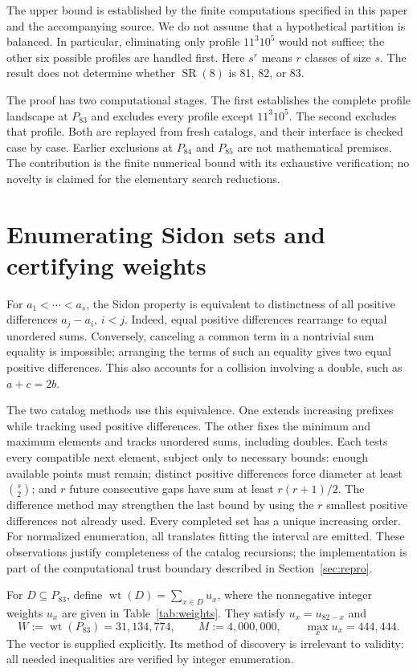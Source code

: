 \documentclass[11pt]{article}
\newcommand{\SR}{\operatorname{SR}}
\newcommand{\wt}{\operatorname{wt}}
\newcommand{\PP}{P_{83}}
\begin{document}
The upper bound is established by the finite computations specified in
this paper and the accompanying source. We do not assume that a
hypothetical partition is balanced. In particular, eliminating only
profile $11^3 10^5$ would not suffice; the other six possible profiles
are handled first. Here $s^r$ means $r$ classes of size $s$.
The result does not determine whether $\SR(8)$ is 81, 82, or 83.

The proof has two computational stages. The first establishes the
complete profile landscape at $P_{83}$ and excludes every profile except
$11^3 10^5$. The second excludes that profile. Both are replayed from
fresh catalogs, and their interface is checked case by case.
Earlier exclusions at $P_{84}$ and $P_{85}$ are not mathematical premises.
The contribution is the finite numerical bound with its exhaustive
verification; no novelty is claimed for the elementary search reductions.

\section{Enumerating Sidon sets and certifying weights}\label{sec:weights}
For $a_1<\cdots<a_s$, the Sidon property is equivalent to distinctness of
all positive differences $a_j-a_i$, $i<j$. Indeed, equal positive
differences rearrange to equal unordered sums. Conversely, canceling a
common term in a nontrivial sum equality is impossible; arranging the
terms of such an equality gives two equal positive differences. This
also accounts for a collision involving a double, such as $a+c=2b$.

The two catalog methods use this equivalence. One extends increasing
prefixes while tracking used positive differences. The other fixes the
minimum and maximum elements and tracks unordered sums, including
doubles. Each tests every compatible next element, subject only to
necessary bounds: enough available points must remain; distinct positive
differences force diameter at least $\binom{s}{2}$; and $r$ future
consecutive gaps have sum at least $r(r+1)/2$. The difference method may
strengthen the last bound by using the $r$ smallest positive differences
not already used. Every completed set has a unique increasing order.
For normalized enumeration, all translates fitting the interval are
emitted. These observations justify completeness of the catalog
recursions; the implementation is part of the computational trust
boundary described in Section~\ref{sec:repro}.

For $D\subseteq\PP$, define $\wt(D)=\sum_{x\in D}u_x$, where the
nonnegative integer weights $u_x$ are given in
Table~\ref{tab:weights}. They satisfy $u_x=u_{82-x}$ and
\begin{equation}\label{eq:constants}
 W:=\wt(\PP)=31{,}134{,}774,\qquad
 M:=4{,}000{,}000,\qquad \max_x u_x=444{,}444.
\end{equation}
The vector is supplied explicitly. Its method of discovery is irrelevant
to validity: all needed inequalities are verified by integer enumeration.
\end{document}
